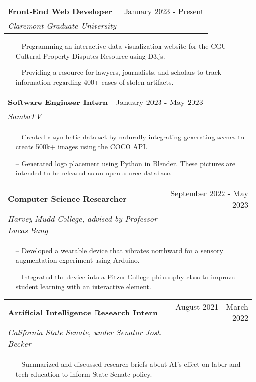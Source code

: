 \documentclass[letterpaper,10pt]{article}
\makeatletter
\newcommand{\resumeSubheading}[4]{
  \vspace{-2pt}\item
    \begin{tabular*}{0.97\textwidth}[t]{l@{\extracolsep{\fill}}r}
      \textbf{#1} & #2 \\
      \textit{\small#3} & \textit{\small #4} \\
    \end{tabular*}\vspace{-7pt}
}
\makeatother
\begin{document}
    \resumeSubheading
      {Front-End Web Developer}{January 2023 - Present}
      {Claremont Graduate University}{}
      \begin{itemize}\small
      \setlength\itemsep{0em}
        \item[--] Programming an interactive data visualization website for the CGU Cultural Property Disputes Resource using D3.js.
        \item[--] Providing a resource for lawyers, journalists, and scholars to track information regarding 400+ cases of stolen artifacts.

      \end{itemize}
    \resumeSubheading
      {Software Engineer Intern}{January 2023 - May 2023}
      {SambaTV}{}
      \begin{itemize}\small
      \setlength\itemsep{0em}
        \item[--] Created a synthetic data set by naturally integrating generating scenes to create 500k+ images using the COCO API.
        \item[--] Generated logo placement using Python in Blender. These pictures are intended to be released as an open source database.

      \end{itemize}
    \resumeSubheading
      {Computer Science Researcher}{September 2022 - May 2023}
      {Harvey Mudd College, advised by Professor Lucas Bang}{}
      \begin{itemize}\small
      \setlength\itemsep{0em}
        \item[--] Developed a wearable device that vibrates northward for a sensory augmentation experiment using Arduino.
        \item[--] Integrated the device into a Pitzer College philosophy class to improve student learning with an interactive element.

      \end{itemize}

    
    \resumeSubheading
      {Artificial Intelligence Research Intern}{August 2021 - March 2022}
      {California State Senate, under Senator Josh Becker}{}
      \begin{itemize}\small
      \setlength\itemsep{0em}
        \item[--] Summarized and discussed research briefs about AI’s effect on labor and tech education to inform State Senate policy.

      \end{itemize}
      
\end{document}
